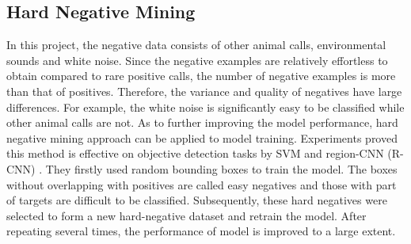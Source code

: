 \subsection{Hard Negative Mining}
In this project, the negative data consists of other animal calls, environmental sounds and white noise. Since the negative examples are relatively effortless to obtain compared to rare positive calls, the number of negative examples is more than that of positives. Therefore, the variance and quality of negatives have large differences. For example, the white noise is significantly easy to be classified while other animal calls are not. As to further improving the model performance, hard negative mining approach can be applied to model training. Experiments proved this method is effective on objective detection tasks by SVM \cite{felzenszwalb2009object} and region-CNN (R-CNN) \cite{girshick2014rich}. They firstly used random bounding boxes to train the model. The boxes without overlapping with positives are called easy negatives and those with part of targets are difficult to be classified. Subsequently, these hard negatives were selected to form a new hard-negative dataset and retrain the model. After repeating several times, the performance of model is improved to a large extent. 
